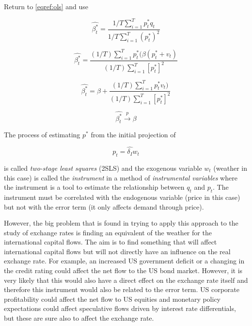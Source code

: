 \documentclass[12pt, a4paper, oneside]{article}\usepackage[]{graphicx}\usepackage[]{color}
\begin{document}
Return to \ref{eqref:ols} and use 

\begin{equation}
\hat{\beta_t^*}=\frac{1/T \sum_{i=1}^{T} p_t^* q_t}{1/T \sum_{i=1}^{T} (p_t^*)^2}
\end{equation}

\begin{equation}
\hat{\beta_t^*}=\frac{(1/T) \sum_{i=1}^T p_t^* (\beta (p_t^* + v_t)}{(1/T) \sum_{i=1}^T [p_t^*]^2}
\end{equation}
 
\begin{equation}
\hat{\beta_t^*}=\beta + \frac{(1/T) \sum_{i=1}^T p_t^*  v_t)}{(1/T) \sum_{i=1}^T [p_t^*]^2}
\end{equation}

\begin{equation}
\hat{\beta_t^*} \overset{p}{\rightarrow} \beta
\end{equation}

The process of estimating $p^*$ from the initial projection of 

\begin{equation}
p_t=\hat{\delta_I}w_t
\end{equation}

is called \emph{two-stage least squares} (2SLS) and the exogenous variable $w_t$ (weather in this case) is called the \emph{instrument} in a method of \emph{instrumental variables} where the instrument is a tool to estimate the relationship between $q_t$ and $p_t$.  The instrument must be correlated with the endogenous variable (price in this case) but not with the error term (it only affects demand through price).  

However, the big problem that is found in trying to apply this approach to the study of exchange rates is finding an equivalent of the weather for the international capital flows. The aim is to find something that will affect international capital flows but will not directly have an influence on the real exchange rate.  For example, an increased US government deficit or a changing in the credit rating could affect the net flow to the US bond market.  However, it is very likely that this would also have a direct effect on the exchange rate itself and therefore this instrument would also be related to the error term.  US corporate profitability could affect the net flow to US equities and monetary policy expectations could affect speculative flows driven by interest rate differentials, but these are sure also to affect the exchange rate. 
\end{document}
